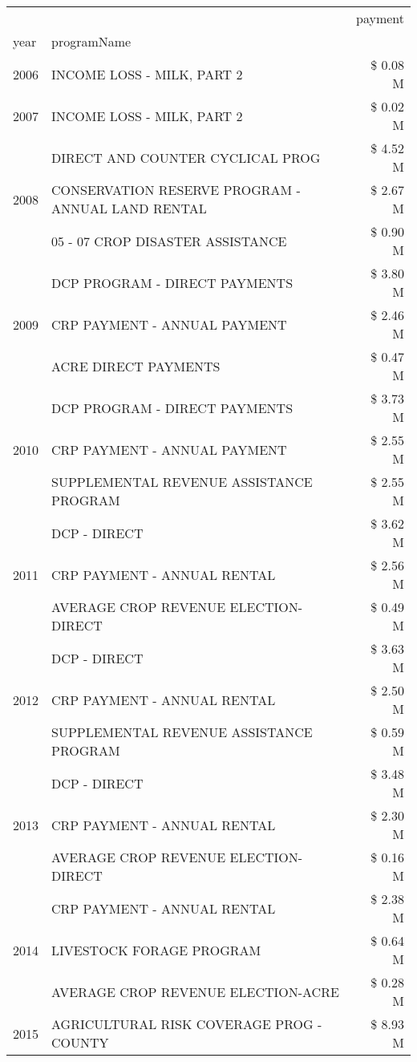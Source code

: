 \begin{tabular}{llr}
\toprule
 &  & payment \\
year & programName &  \\
\midrule
2006 & INCOME LOSS - MILK, PART 2 & \$ 0.08 M \\
\cline{1-3}
2007 & INCOME LOSS - MILK, PART 2 & \$ 0.02 M \\
\cline{1-3}
\multirow[t]{3}{*}{2008} & DIRECT AND COUNTER CYCLICAL PROG & \$ 4.52 M \\
 & CONSERVATION RESERVE PROGRAM - ANNUAL LAND RENTAL & \$ 2.67 M \\
 & 05 - 07 CROP DISASTER ASSISTANCE & \$ 0.90 M \\
\cline{1-3}
\multirow[t]{3}{*}{2009} & DCP PROGRAM - DIRECT PAYMENTS & \$ 3.80 M \\
 & CRP PAYMENT - ANNUAL PAYMENT & \$ 2.46 M \\
 & ACRE DIRECT PAYMENTS & \$ 0.47 M \\
\cline{1-3}
\multirow[t]{3}{*}{2010} & DCP PROGRAM - DIRECT PAYMENTS & \$ 3.73 M \\
 & CRP PAYMENT - ANNUAL PAYMENT & \$ 2.55 M \\
 & SUPPLEMENTAL REVENUE ASSISTANCE PROGRAM & \$ 2.55 M \\
\cline{1-3}
\multirow[t]{3}{*}{2011} & DCP - DIRECT & \$ 3.62 M \\
 & CRP PAYMENT - ANNUAL RENTAL & \$ 2.56 M \\
 & AVERAGE CROP REVENUE ELECTION-DIRECT & \$ 0.49 M \\
\cline{1-3}
\multirow[t]{3}{*}{2012} & DCP - DIRECT & \$ 3.63 M \\
 & CRP PAYMENT - ANNUAL RENTAL & \$ 2.50 M \\
 & SUPPLEMENTAL REVENUE ASSISTANCE PROGRAM & \$ 0.59 M \\
\cline{1-3}
\multirow[t]{3}{*}{2013} & DCP - DIRECT & \$ 3.48 M \\
 & CRP PAYMENT - ANNUAL RENTAL & \$ 2.30 M \\
 & AVERAGE CROP REVENUE ELECTION-DIRECT & \$ 0.16 M \\
\cline{1-3}
\multirow[t]{3}{*}{2014} & CRP PAYMENT - ANNUAL RENTAL & \$ 2.38 M \\
 & LIVESTOCK FORAGE PROGRAM & \$ 0.64 M \\
 & AVERAGE CROP REVENUE ELECTION-ACRE & \$ 0.28 M \\
\cline{1-3}
\multirow[t]{3}{*}{2015} & AGRICULTURAL RISK COVERAGE PROG - COUNTY & \$ 8.93 M \\

\end{tabular}
